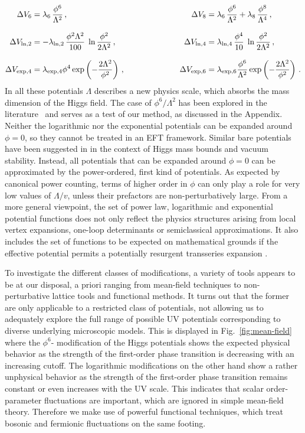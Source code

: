 \documentclass[aps,prd,11pt,tightenlines,superscriptaddress,nofootinbib,preprintnumbers,notitlepage]{revtex4-1}
\newcommand{\qqqquad}{\qquad \qquad \qquad}
\begin{document}
\begin{alignat}{9} 
 \Delta V_6  &= \lambda_6 \, \frac{\phi^6}{\Lambda^2}\,,  \qqqquad &
 \Delta V_8  &= \lambda_6 \, \frac{\phi^6}{\Lambda^2}
             +  \lambda_8 \, \frac{\phi^8}{\Lambda^4} \,, \notag\\[2ex]
 \Delta V_{\ln,2}  &= -\lambda_{\ln,2} \, \frac{\phi^2\Lambda^2}{100} \; 
\ln \frac{\phi^2}{2\Lambda^2}\,, \qqqquad &
 \Delta V_{\ln,4}  &= \lambda_{\ln,4} \, \frac{\phi^4}{10} \; \ln \frac{\phi^2}{2\Lambda^2} 
\,, \notag\\[2ex]
 \Delta V_{\exp,4}  &= \lambda_{\exp,4} \phi^4  \exp\left(-
\frac{2\Lambda^2}{\phi^2}\right)\,, \qqqquad &
 \Delta V_{\exp,6}  &= \lambda_{\exp,6} \frac{\phi^6}{\Lambda^2}  
\exp\left(-\frac{2\Lambda^2}{\phi^2} \right)\,.
\label{eq:pots}
\end{alignat}
%
In all these potentials $\Lambda$ describes a new physics scale, which
absorbs the mass dimension of the Higgs field.  The case of
$\phi^6/\Lambda^2$ has been explored in the
literature~\cite{eft2,Noble,christophe_geraldine} and serves as a test
of our method, as discussed in the Appendix.  Neither the logarithmic
nor the exponential potentials can be expanded around $\phi=0$, so
they cannot be treated in an EFT framework. Similar bare potentials 
have been suggested in \cite{Sondenheimer:2017jin} in the context of 
Higgs mass bounds and vacuum stability. Instead, all potentials
that can be expanded around $\phi=0$ can be approximated by the
power-ordered, first kind of potentials. As expected by canonical
power counting, terms of higher order in $\phi$ can only play a role
for very low values of $\Lambda/v$, unless their prefactors are
non-perturbatively large. From a more general viewpoint, the set of
power law, logarithmic and exponential potential functions does not
only reflect the physics structures arising from local vertex
expansions, one-loop determinants or semiclassical approximations. It
also includes the set of functions to be expected on mathematical
grounds if the effective potential permits a potentially
resurgent transseries expansion \cite{Dunne:2012ae}.\medskip

To investigate the different classes of modifications, a variety of
tools appears to be at our disposal, a priori ranging from mean-field
techniques to non-perturbative lattice tools and functional methods. It
turns out that the former are only applicable to a restricted class of
potentials, not allowing us to adequately explore the full range of
possible UV potentials corresponding to diverse underlying microscopic
models. This is displayed in Fig.~\ref{fig:mean-field} where the $\phi^6$-
modification of the Higgs potentials shows the expected physical behavior
as the strength of the first-order phase transition is decreasing with 
an increasing cutoff. The logarithmic modifications on the other hand
show a rather unphysical behavior as the strength of the first-order
phase transition remains constant or even increases with the UV scale.
This indicates that scalar order-parameter fluctuations are important, 
which are ignored in simple mean-field theory.
Therefore we make use of powerful functional techniques, which treat bosonic
and fermionic fluctuations on the same footing.
\end{document}
